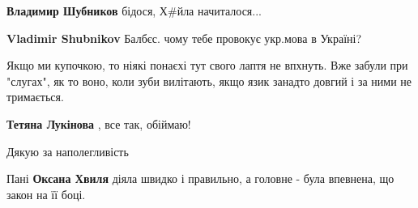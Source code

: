 \begin{itemize}
\begin{itemize}
\textbf{Владимир Шубников} бідося, Х\#йла начиталося...

 
\textbf{Vladimir Shubnikov} Балбєс. чому тебе провокує укр.мова в Україні?

\end{itemize}

 

Якщо ми купочкою, то ніякі понаєхі тут свого лаптя не впхнуть. Вже забули при
"слугах", як то воно, коли зуби вилітають, якщо язик занадто довгий і за ними
не тримається.

\begin{itemize}
 
\textbf{Тетяна Лукінова} , все так, обіймаю!
\end{itemize}

 
Дякую за наполегливість

 
Пані \textbf{Оксана Хвиля} діяла швидко і правильно, а головне - була впевнена, що закон на її боці.

 

\end{itemize}
